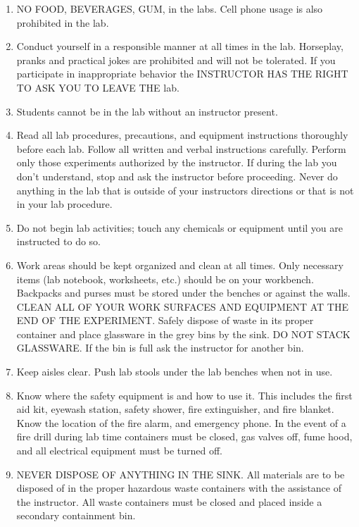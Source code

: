 \documentclass[]{book}
\providecommand{\tightlist}{%
  \setlength{\itemsep}{0pt}\setlength{\parskip}{0pt}}
\begin{document}
\begin{enumerate}
\def\labelenumi{\arabic{enumi}.}
\tightlist
\item
  NO FOOD, BEVERAGES, GUM, in the labs. Cell phone usage is also
  prohibited in the lab.
\item
  Conduct yourself in a responsible manner at all times in the lab.
  Horseplay, pranks and practical jokes are prohibited and will not be
  tolerated. If you participate in inappropriate behavior the INSTRUCTOR
  HAS THE RIGHT TO ASK YOU TO LEAVE THE lab.
\item
  Students cannot be in the lab without an instructor present.
\item
  Read all lab procedures, precautions, and equipment instructions
  thoroughly before each lab. Follow all written and verbal instructions
  carefully. Perform only those experiments authorized by the
  instructor. If during the lab you don't understand, stop and ask the
  instructor before proceeding. Never do anything in the lab that is
  outside of your instructors directions or that is not in your lab
  procedure.
\item
  Do not begin lab activities; touch any chemicals or equipment until
  you are instructed to do so.
\item
  Work areas should be kept organized and clean at all times. Only
  necessary items (lab notebook, worksheets, etc.) should be on your
  workbench. Backpacks and purses must be stored under the benches or
  against the walls. CLEAN ALL OF YOUR WORK SURFACES AND EQUIPMENT AT
  THE END OF THE EXPERIMENT. Safely dispose of waste in its proper
  container and place glassware in the grey bins by the sink. DO NOT
  STACK GLASSWARE. If the bin is full ask the instructor for another
  bin.
\item
  Keep aisles clear. Push lab stools under the lab benches when not in
  use.
\item
  Know where the safety equipment is and how to use it. This includes
  the first aid kit, eyewash station, safety shower, fire extinguisher,
  and fire blanket. Know the location of the fire alarm, and emergency
  phone. In the event of a fire drill during lab time containers must be
  closed, gas valves off, fume hood, and all electrical equipment must
  be turned off.
\item
  NEVER DISPOSE OF ANYTHING IN THE SINK. All materials are to be
  disposed of in the proper hazardous waste containers with the
  assistance of the instructor. All waste containers must be closed and
  placed inside a secondary containment bin.

\end{enumerate}
\end{document}
